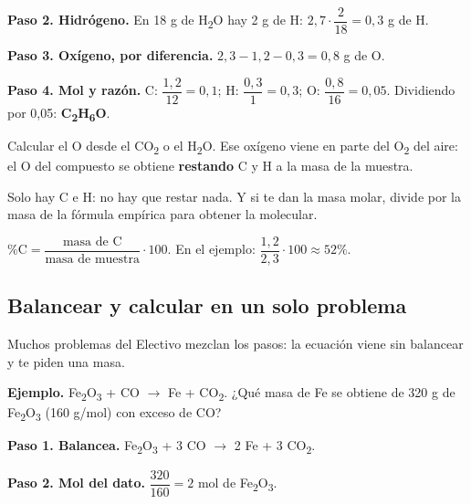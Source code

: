  

\textbf{Paso 2. Hidrógeno.} En 18 g de H\textsubscript{2}O hay 2 g de H: $2{,}7\cdot\dfrac{2}{18} = 0{,}3$ g de H.

 

\textbf{Paso 3. Oxígeno, por diferencia.} $2{,}3 - 1{,}2 - 0{,}3 = 0{,}8$ g de O.

 

\textbf{Paso 4. Mol y razón.} C: $\dfrac{1{,}2}{12} = 0{,}1$; H: $\dfrac{0{,}3}{1} = 0{,}3$; O: $\dfrac{0{,}8}{16} = 0{,}05$. Dividiendo por 0,05: \textbf{C\textsubscript{2}H\textsubscript{6}O}.

  
\begin{ojo} Calcular el O desde el CO\textsubscript{2} o el H\textsubscript{2}O. Ese oxígeno viene en parte del O\textsubscript{2} del aire: el O del compuesto se obtiene \textbf{restando} C y H a la masa de la muestra.\end{ojo}
 
\begin{clave}[{Si es un hidrocarburo}] Solo hay C e H: no hay que restar nada. Y si te dan la masa molar, divide por la masa de la fórmula empírica para obtener la molecular.\end{clave}
 
\begin{clave}[{Porcentaje de C}] $\%\text{C} = \dfrac{\text{masa de C}}{\text{masa de muestra}}\cdot 100$. En el ejemplo: $\dfrac{1{,}2}{2{,}3}\cdot 100 \approx 52\%$.\end{clave}
\subsection{Balancear y calcular en un solo problema}
Muchos problemas del Electivo mezclan los pasos: la ecuación viene sin balancear y te piden una masa.

 

\textbf{Ejemplo.} Fe\textsubscript{2}O\textsubscript{3} + CO \ensuremath{\rightarrow} Fe + CO\textsubscript{2}. ¿Qué masa de Fe se obtiene de 320 g de Fe\textsubscript{2}O\textsubscript{3} (160 g/mol) con exceso de CO?

 

\textbf{Paso 1. Balancea.} Fe\textsubscript{2}O\textsubscript{3} + 3 CO \ensuremath{\rightarrow} 2 Fe + 3 CO\textsubscript{2}.

 

\textbf{Paso 2. Mol del dato.} $\dfrac{320}{160} = 2$ mol de Fe\textsubscript{2}O\textsubscript{3}.

